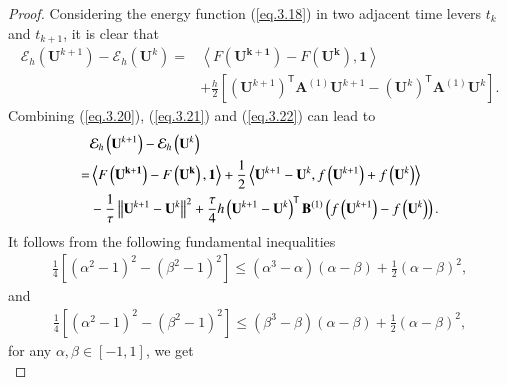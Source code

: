 \documentclass{siamart171218}
\numberwithin{theorem}{section}
\numberwithin{equation}{section}
\begin{document}
\begin{proof}
Considering the energy function (\ref{eq.3.18}) in two adjacent time
 levers $t_k$ and $t_{k+1}$, it is clear that
 \begin{equation}\label{eq.3.22}
\begin{aligned}\displaystyle
{\mathcal{E}}_h\left(\mathbf{U}^{k+1}\right)-{\mathcal{E}}_h\left(\mathbf{U}^k\right)=&\left<
F\left(\mathbf{U^{k+1}}\right)-
F\left(\mathbf{U^{k}}\right),\mathbf{1}\right>\\&
+\frac{h}{2}\left[\left(\mathbf{U}^{k+1}\right)^{\mathsf{T}}\mathbf{A}^{(1)}
\mathbf{U}^{k+1}
-
\left(\mathbf{U}^k\right)^{\mathsf{T}}\mathbf{A}^{(1)}\mathbf{U}^k\right].
\end{aligned}
\end{equation}
Combining (\ref{eq.3.20}), (\ref{eq.3.21}) and (\ref{eq.3.22}) can lead to
 \begin{equation}\label{eq.3.23}
\begin{aligned}\displaystyle
&{\mathcal{E}}_h\left(\mathbf{U}^{k+1}\right)-{\mathcal{E}}_h\left(\mathbf{U}^k\right)\\=&\left<
F\left(\mathbf{U^{k+1}}\right)-
F\left(\mathbf{U^{k}}\right),\mathbf{1}\right>
+\frac{1}{2}\left<\mathbf{U}^{k+1}-\mathbf{U}^k,f\left(\mathbf{U}^{k+1}\right)+f\left(\mathbf{U}^{k}\right)\right>\\&
-\frac{1}{\tau}\left\|\mathbf{U}^{k+1}-\mathbf{U}^k\right\|^2+\frac{\tau}{4} h\left(\mathbf{U}^{k+1}
-\mathbf{U}^k\right)^{\mathsf{T}}\mathbf{B}^{(1)}\left(
 f\left(\mathbf{U}^{k+1}\right)- f\left(\mathbf{U}^{k}\right)\right).
\end{aligned}
\end{equation}
It follows from the following fundamental inequalities
 \begin{equation*}
\begin{aligned}\displaystyle
\frac{1}{4}\left[\left(\alpha^2-1\right)^2-\left(\beta^2-1\right)^2\right]\leq
\left(\alpha^3-\alpha\right)\left(\alpha-\beta\right)+\frac{1}{2}\left(\alpha-\beta\right)^2,
\end{aligned}
\end{equation*}
and
 \begin{equation*}
\begin{aligned}\displaystyle
\frac{1}{4}\left[\left(\alpha^2-1\right)^2-\left(\beta^2-1\right)^2\right]\leq
\left(\beta^3-\beta\right)\left(\alpha-\beta\right)+\frac{1}{2}\left(\alpha-\beta\right)^2,
\end{aligned}
\end{equation*}
for any $\alpha,\beta\in[-1,1]$, we get
 \begin{equation}\label{eq.3.24}

\end{equation}
\end{proof}
\end{document}
